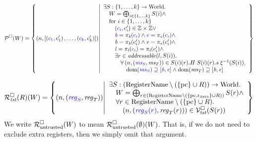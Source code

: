 \documentclass[a4paper]{article}
\begin{document}
\[
  \lrp(W) =
    \left\{
    \npair{ [\stpair[.]{c_1}{c'_1}, \dots, \stpair[.]{c_k}{c'_k}] } \middle| 
    \begin{array}{l}
      \exists S : \{1,\dots,k\} \fun \World \ldotp \\
      \quad W = \bigoplus_{i\in\{1,\dots,k\}} S(i)\wedge \\
      \quad\text{for $i \in \{1,\dots,k\}$} \\
      \qquad\stpair[.]{c_i}{c'_i} \in \ints \times \ints \vee \\
      \qquad\src{\baddr} = \pi_\baddr(\src{c_i}) \wedge \src{\eaddr} = \pi_\eaddr(\src{c_i}) \wedge \\
      \qquad\baddr = \pi_\baddr(c_i') \wedge \eaddr = \pi_\eaddr(c_i') \wedge \\
      \qquad\src{\lin} = \pi_\lin(\src{c_i}) = \pi_\lin(c_i') \wedge \\
      \qquad \exists r \in \addressable{l,S(i)} \ldotp\\
      \qquad \quad \forall \npair{\stpair{\ms}{\ms}} \in S(i)(r).H \; S(i)(r).s \; \xi^{-1}(S(i))  \ldotp \\
      \qquad \qquad \dom(\src{\ms_S}) \supseteq [\src{\baddr},\src{\eaddr}] \wedge \dom(\ms_T) \supseteq [\baddr,\eaddr]      
    \end{array}
  \right\}
\]


\[
  \lrrg{\trust}(R)(W) = \left\{ \npair{\stpair{\reg}{\reg}} \middle|
    \begin{array}{l}
      \exists S : (\RegName \setminus (\{\pcreg \} \cup R))\fun \World \ldotp \\
      \quad W = \bigoplus_{r \in (\RegName\setminus (\{\pcreg,\rdata \} \cup R))} S(r) \wedge \\
      \quad \forall r \in \RegName \setminus (\{\pcreg \} \cup R)\ldotp\\
      \qquad\npair{\stpair[.]{\src{\reg_S(r)}}{\reg_T(r)}} \in \lrvg{\trust}(S(r))
    \end{array}
            \right\}
\]
We write $\mathcal{R}^{\square}_{\mathrm{untrusted}}(W)$ to mean $\mathcal{R}^{\square}_{\mathrm{untrusted}}(\emptyset)(W)$. That is, if we do not need to exclude extra registers, then we simply omit that argument.
\end{document}
